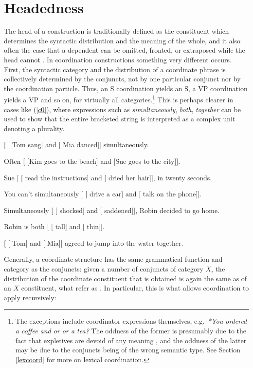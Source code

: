 \documentclass[output=paper
                ,modfonts
                ,nonflat
	        ,collection
	        ,collectionchapter
	        ,collectiontoclongg
 	        ,biblatex
                ,babelshorthands
                ,newtxmath
                ,draftmode
                ,colorlinks, citecolor=brown
]{./langsci/langscibook}
\begin{document}
{\section{Headedness}

The head of a construction is traditionally defined as the constituent which determines the syntactic distribution and the meaning of the whole, and it also often the case that a dependent can be omitted, fronted, or extraposed while the head cannot \citep{zwicky85}. In coordination constructions something very different occurs. First, the syntactic category and the distribution of a coordinate phrase is collectively determined by the conjuncts, not by one particular conjunct nor by the coordination particle. Thus, an S coordination yields an S, a VP coordination yields a VP and so on, for virtually all categories.\footnote{The exceptions include coordinator expressions themselves, e.g.\ \emph{*You ordered a coffee and or or a tea?} The oddness of the former is presumably due to the fact that expletives are devoid of any meaning
\citep{MuellerGT-Eng1}, and the oddness of the latter may be due to the conjuncts being of the wrong semantic type. See Section \ref{lexcoord} for more on lexical coordination.}
This is perhaps clearer in cases like (\ref{c0}), where
expressions such as \emph{simultaneously}, \emph{both}, 
\emph{together} can be used to show that the entire bracketed string
is interpreted as a complex unit denoting a plurality.


\eal
\label{c0}
\ex{} [ [ Tom sang] and [ Mia danced]] simultaneously.

\ex{} Often [ [Kim goes to the beach] and [Sue goes to the city]].

\ex{} Sue [ [ read the instructions] and [ dried her hair]], in twenty seconds.

\ex{} You can't simultaneously [ [ drive a car] and [ talk on the phone]].

\ex{} Simultaneously [ [ shocked] and [ saddened]], Robin decided to go home.

\ex Robin is both [ [ tall] and [ thin]].

\ex{} [ [ Tom] and [ Mia]] agreed to jump into the water together.
\zl


Generally, a coordinate structure has the same grammatical function and category as the conjuncts: given a number of conjuncts of category $X$, the distribution of the coordinate constituent that is obtained is again the same as of an $X$ constituent, what \citet[]{pullumzwicky} refer as .
In particular, this is what allows coordination to apply recursively:

}
\end{document}

